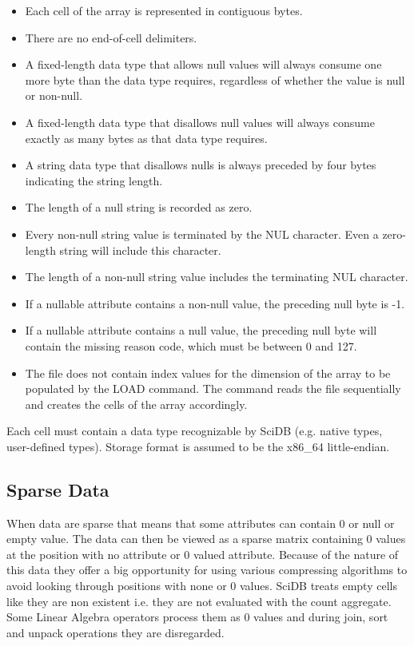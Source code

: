 \begin{itemize}
\item Each cell of the array is represented in contiguous bytes.
\item There are no end-of-cell delimiters.
\item A fixed-length data type that allows null values will always consume one more byte than the data type requires, regardless of whether the value is null or non-null.
\item A fixed-length data type that disallows null values will always consume exactly as many bytes as that data type requires.
\item A string data type that disallows nulls is always preceded by four bytes indicating the string length.
\item The length of a null string is recorded as zero.
\item Every non-null string value is terminated by the NUL character. Even a zero-length string will include this character.
\item The length of a non-null string value includes the terminating NUL character.
\item If a nullable attribute contains a non-null value, the preceding null byte is -1.
\item If a nullable attribute contains a null value, the preceding null byte will contain the missing reason code, which must be between 0 and 127.
\item The file does not contain index values for the dimension of the array to be populated by the LOAD command. The command reads the file sequentially and creates the cells of the array accordingly.
\end{itemize}

Each cell must contain a data type recognizable by SciDB (e.g. native types, user-defined types). Storage format is assumed to be the x86\_64 little-endian.

\subsection{Sparse Data}
When data are sparse that means that some attributes can contain 0 or null or empty value. The data can then be viewed as a sparse matrix containing 0 values at the position with no attribute or 0 valued attribute. Because of the nature of this data they offer a big opportunity for using various compressing algorithms to avoid looking through positions with none or 0 values. SciDB treats empty cells like they are non existent i.e. they are not evaluated with the count aggregate. Some Linear Algebra operators process them as 0 values and during join, sort and unpack operations they are disregarded.


